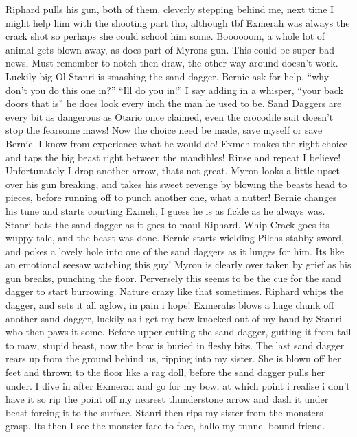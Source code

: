 Riphard pulls his gun, both of them, cleverly stepping behind me, next time I might help him with the shooting part tho, although tbf Exmerah was always the crack shot so perhaps she could school him some.\medskip
Boooooom, a whole lot of animal gets blown away, as does part of Myrons gun. This could be super bad news,\medskip
Must remember to notch then draw, the other way around doesn’t work. Luckily big Ol Stanri is smashing the sand dagger.\medskip
Bernie ask for help, “why don’t you do this one in?”\medskip
“Ill do you in!” I say adding in a whisper, “your back doors that is” he does look every inch the man he used to be.\medskip
Sand Daggers are every bit as dangerous as Otario once claimed, even the crocodile suit doesn’t stop the fearsome maws! Now the choice need be made, save myself or save Bernie. I know from experience what he would do! Exmeh makes the right choice and taps the big beast right between the mandibles! Rinse and repeat I believe! Unfortunately I drop another arrow, thats not great.\medskip
Myron looks a little upset over his gun breaking, and takes his sweet revenge by blowing the beasts head to pieces, before running off to punch another one, what a nutter!\medskip
Bernie changes his tune and starts courting Exmeh, I guess he is as fickle as he always was. Stanri bats the sand dagger as it goes to maul Riphard. Whip Crack goes its wuppy tale, and the beast was done. Bernie starts wielding Pilchs stabby sword, and pokes a lovely hole into one of the sand daggers as it lunges for him. Its like an emotional seesaw watching this guy!\medskip
Myron is clearly over taken by grief as his gun breaks, punching the floor. Perversely this seems to be the cue for the sand dagger to start burrowing. Nature crazy like that sometimes.\medskip
Riphard whips the dagger, and sets it all aglow, in pain i hope! Exmerahs blows a huge chunk off another sand dagger, luckily as i get my bow knocked out of my hand by Stanri who then paws it some. Before upper cutting the sand dagger, gutting it from tail to maw, stupid beast, now the bow is buried in fleshy bits.\medskip
The last sand dagger rears up from the ground behind us, ripping into my sister. She is blown off her feet and thrown to the floor like a rag doll, before the sand dagger pulls her under.\medskip
I dive in after Exmerah and go for my bow, at which point i realise i don’t have it so rip the point off my nearest thunderstone arrow and dash it under beast forcing it to the surface. Stanri then rips my sister from the monsters grasp.\medskip
Its then I see the monster face to face, hallo my tunnel bound friend.\medskip
